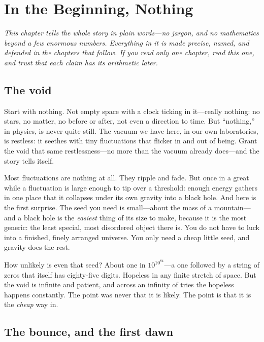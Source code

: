 \chapter{In the Beginning, Nothing}
\label{chap:overture}

\noindent\emph{This chapter tells the whole story in plain words---no jargon, and
no mathematics beyond a few enormous numbers. Everything in it is made precise,
named, and defended in the chapters that follow. If you read only one chapter,
read this one, and trust that each claim has its arithmetic later.}

\section*{The void}

Start with nothing. Not empty space with a clock ticking in it---really nothing:
no stars, no matter, no before or after, not even a direction to time. But
``nothing,'' in physics, is never quite still. The vacuum we have here, in our own
laboratories, is restless: it seethes with tiny fluctuations that flicker in and
out of being. Grant the void that same restlessness---no more than the vacuum
already does---and the story tells itself.

Most fluctuations are nothing at all. They ripple and fade. But once in a great
while a fluctuation is large enough to tip over a threshold: enough energy gathers
in one place that it collapses under its own gravity into a black hole. And here
is the first surprise. The seed you need is small---about the mass of a
mountain---and a black hole is the \emph{easiest} thing of its size to make,
because it is the most generic: the least special, most disordered object there
is. You do not have to luck into a finished, finely arranged universe. You only
need a cheap little seed, and gravity does the rest.

How unlikely is even that seed? About one in $10^{10^{84}}$---a one followed by a
string of zeros that itself has eighty-five digits. Hopeless in any finite stretch
of space. But the void is infinite and patient, and across an infinity of tries
the hopeless happens constantly. The point was never that it is likely. The point
is that it is the \emph{cheap} way in.

\section*{The bounce, and the first dawn}

